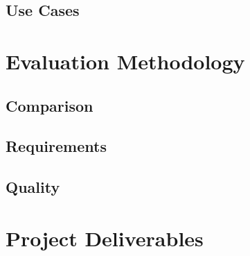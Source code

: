 
\subsection{Use Cases}



\section{Evaluation Methodology}


\subsection{Comparison}


\subsection{Requirements}


\subsection{Quality}


\section{Project Deliverables}
